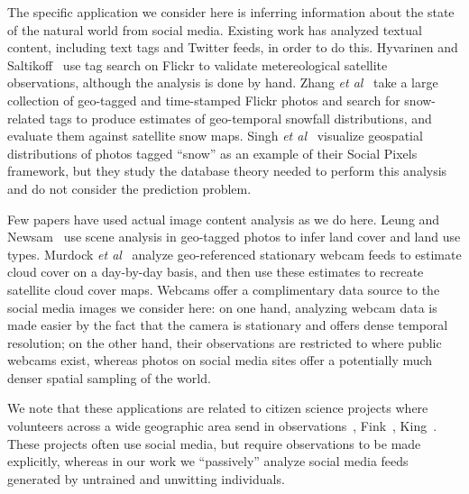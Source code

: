 

The specific application we consider here is inferring
information about the state of the natural world from social media.
Existing work has analyzed textual content, including text tags and
Twitter feeds, in order to do this. Hyvarinen and
Saltikoff~\cite{meteo} use tag search on Flickr to validate
metereological satellite observations, although the analysis is done
by hand. Zhang \textit{et al}~\cite{ecology2012www} take a large
collection of geo-tagged and time-stamped Flickr photos and search for
snow-related tags to produce estimates of geo-temporal snowfall
distributions, and evaluate them against satellite snow maps.
Singh \textit{et al}~\cite{singh10socialpixels} visualize geospatial
distributions of photos tagged ``snow'' as an example of
their Social Pixels framework, but they study the
database theory needed to perform this analysis
and do not consider the prediction problem.  


Few papers have used actual image content
analysis as we do here. Leung and Newsam~\cite{Leung:2010wa} use scene
analysis in geo-tagged photos to infer land cover and land use types.
Murdock \textit{et al}~\cite{murdock} analyze  geo-referenced
stationary webcam feeds to estimate cloud cover on a day-by-day
basis, and then use these estimates to recreate satellite cloud cover
maps.  Webcams offer a complimentary data source to the social media
images we consider here: on one hand, analyzing webcam data is made
easier by the fact that the camera is stationary and offers dense
temporal resolution; on the other hand, their observations are restricted to 
where public webcams exist, whereas photos on social media sites 
offer a potentially much denser spatial sampling of the world.

We note that these applications are related to citizen science
projects where volunteers across a wide geographic area send 
in observations~\cite{greatsunflower}, Fink\etal~\cite{ebirds}, King\etal~\cite{king09snowtweets}. These projects
often use social media, but require observations to be made
explicitly, whereas in our work we ``passively'' analyze social
media feeds generated by untrained and unwitting individuals.

